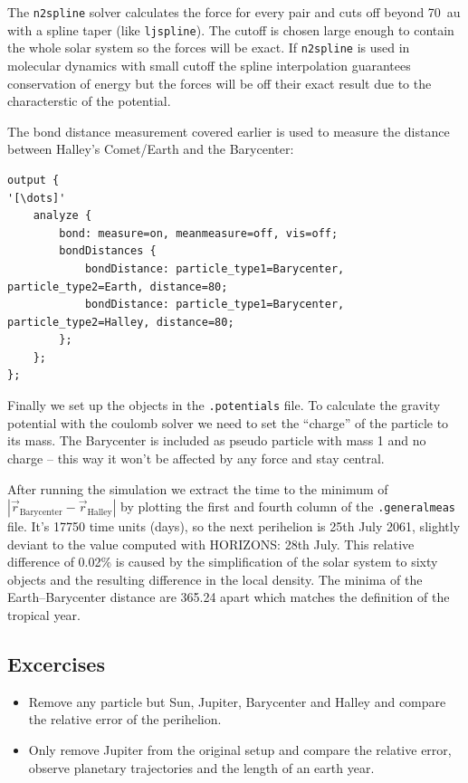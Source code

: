 The \texttt{n2spline} solver calculates the force for every pair and cuts
off beyond \SI{70}{\astronomicalunit} with a spline taper (like
\texttt{ljspline}). The cutoff is chosen large enough to contain the
whole solar system so the forces will be exact. If \texttt{n2spline} is
used in molecular dynamics with small cutoff the spline interpolation
guarantees conservation of energy but the forces will be off their exact
result due to the characterstic of the potential.

The bond distance measurement covered earlier is used to measure the
distance between Halley's Comet/Earth and the Barycenter:
\begin{lstlisting}[escapechar=']
output {
'[\dots]'
    analyze {
        bond: measure=on, meanmeasure=off, vis=off;
        bondDistances {
            bondDistance: particle_type1=Barycenter, particle_type2=Earth, distance=80;
            bondDistance: particle_type1=Barycenter, particle_type2=Halley, distance=80;
        };
    };
};
\end{lstlisting}

Finally we set up the objects in the \texttt{.potentials} file. To
calculate the gravity potential with the coulomb solver we need to set
the ``charge'' of the particle to its mass. The Barycenter is included
as pseudo particle with mass 1 and no charge -- this way it won't be
affected by any force and stay central.

After running the simulation we extract the time to the minimum of
$|\vec r_\mathrm{Barycenter}-\vec r_\mathrm{Halley}|$ by plotting the
first and fourth column of the \texttt{.generalmeas} file. It's 17750
time units (days), so the next perihelion is 25th July 2061, slightly
deviant to the value computed with HORIZONS: 28th July. This relative
difference of 0.02\% is caused by the simplification of the solar system
to sixty objects and the resulting difference in the local density. The
minima of the Earth--Barycenter distance are \SI{365.24}{\siday} apart
which matches the definition of the tropical year.

\subsection{Excercises}
\begin{itemize}
    \item Remove any particle but Sun, Jupiter, Barycenter and Halley
        and compare the relative error of the perihelion.
    \item Only remove Jupiter from the original setup and compare the
        relative error, observe planetary trajectories and the length of an
        earth year.
\end{itemize}


